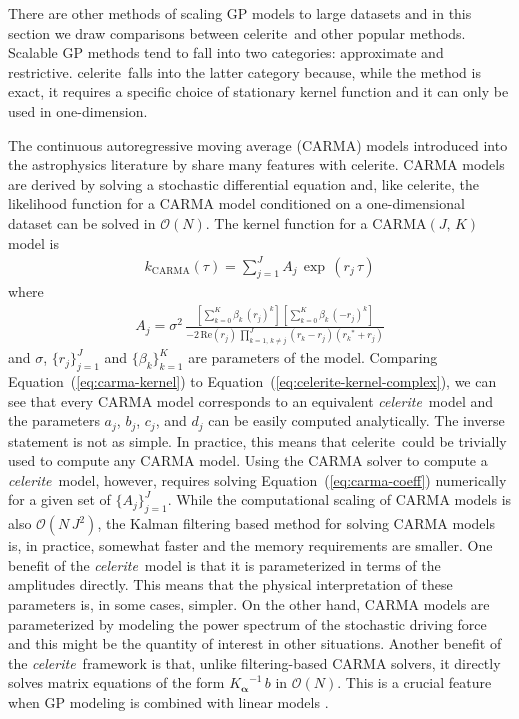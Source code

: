 \documentclass[manuscript, letterpaper]{aastex6}
\makeatletter
\let\origsubsection\subsection
\renewcommand\subsection{\@ifstar{\starsubsection}{\nostarsubsection}}
\newcommand\nostarsubsection[1]{\subsectionprelude\origsubsection{#1}}
\newcommand\starsubsection[1]{\subsectionprelude\origsubsection*{#1}}
\newcommand\subsectionprelude{\vspace{1em}}
\newcommand{\project}[1]{\textsf{#1}}
\newcommand{\celerite}{\project{celerite}}
\newcommand{\celeriteterm}{\emph{celerite}}
\renewcommand{\eqref}[1]{\ref{eq:#1}}
\newcommand{\Eq}[1]{Equation~(\eqref{#1})}
\newcommand{\eq}[1]{\Eq{#1}}
\newcommand{\eqlabel}[1]{\label{eq:#1}}
\newcommand{\sectlabel}[1]{\label{sect:#1}}
\newcommand{\bvec}[1]{{\ensuremath{\boldsymbol{#1}}}}
\newcommand{\response}[1]{{\color{blue}#1}}
\makeatother
\begin{document}
There are other methods of scaling GP models to large datasets and in this
section we draw comparisons between \celerite\ and other popular methods.
Scalable GP methods tend to fall into two categories: approximate and
restrictive.
\celerite\ falls into the latter category because, while the method is exact,
it requires a specific choice of stationary kernel function and it can only be
used in one-dimension.

\subsection{Kalman filtering \& CARMA models} \sectlabel{kalman}

\response{
The continuous autoregressive moving average (CARMA) models introduced into
the astrophysics literature by \citet{Kelly:2014} share many features with
\celerite.
CARMA models are derived by solving a stochastic differential equation and,
like \celerite, the likelihood function for a CARMA model conditioned on a
one-dimensional dataset can be solved in $\mathcal{O}(N)$.
The kernel function for a CARMA$(J,\,K)$ model is \citep{Kelly:2014}
\begin{eqnarray}\eqlabel{carma-kernel}
k_\mathrm{CARMA}(\tau) = \sum_{j=1}^J A_j\,\exp\,(r_j\,\tau)
\end{eqnarray}
where
\begin{eqnarray}\eqlabel{carma-coeff}
A_j = \sigma^2 \,\frac{\left[\sum_{k=0}^K\beta_k\,{(r_j)}^k\right]\,
    \left[\sum_{k=0}^K\beta_k\,{(-r_j)}^k\right]}
    {-2\,\mathrm{Re}(r_j)\,\prod_{k=1,\,k \ne j}^{J}(r_k-r_j)({r_k}^*+r_j)}
\end{eqnarray}
and $\sigma$, $\{r_j\}_{j=1}^J$ and $\{\beta_k\}_{k=1}^K$ are parameters of
the model.
Comparing \eq{carma-kernel} to \eq{celerite-kernel-complex}, we can see that
every CARMA model corresponds to an equivalent \celeriteterm\ model and the
parameters $a_j$, $b_j$, $c_j$, and $d_j$ can be easily computed analytically.
The inverse statement is not as simple.
In practice, this means that \celerite\ could be trivially used to compute any
CARMA model.
Using the CARMA solver to compute a \celeriteterm\ model, however, requires
solving \eq{carma-coeff} numerically for a given set of $\{A_j\}_{j=1}^J$.
While the computational scaling of CARMA models is also $\mathcal{O}(N\,J^2)$,
the Kalman filtering based method for solving CARMA models \citep{Kelly:2014}
is, in practice, somewhat faster and the memory requirements are smaller.
One benefit of the \celeriteterm\ model is that it is parameterized in terms
of the amplitudes directly.
This means that the physical interpretation of these parameters is, in some
cases, simpler.
On the other hand, CARMA models are parameterized by modeling the power
spectrum of the stochastic driving force and this might be the quantity of
interest in other situations.
Another benefit of the \celeriteterm\ framework is that, unlike
filtering-based CARMA solvers, it directly solves matrix equations of the form
${K_\bvec{\alpha}}^{-1}\,b$ in $\mathcal{O}(N)$.
This is a crucial feature when GP modeling is combined with linear models
\citep[for example][]{Luger:2017}.
}
\end{document}
